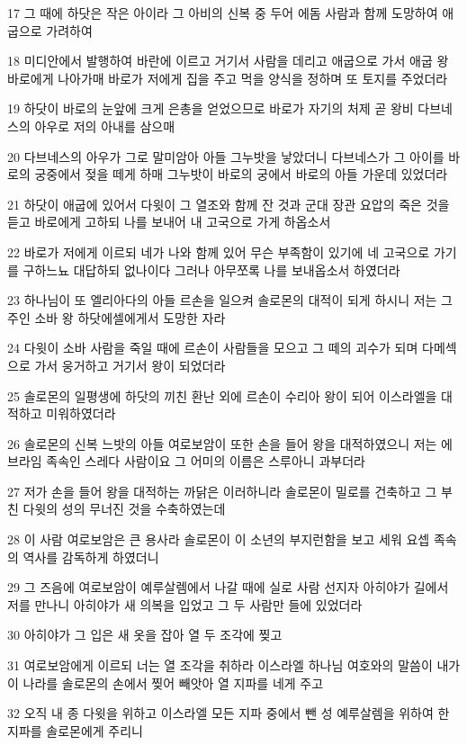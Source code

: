 \par 17 그 때에 하닷은 작은 아이라 그 아비의 신복 중 두어 에돔 사람과 함께 도망하여 애굽으로 가려하여
\par 18 미디안에서 발행하여 바란에 이르고 거기서 사람을 데리고 애굽으로 가서 애굽 왕 바로에게 나아가매 바로가 저에게 집을 주고 먹을 양식을 정하며 또 토지를 주었더라
\par 19 하닷이 바로의 눈앞에 크게 은총을 얻었으므로 바로가 자기의 처제 곧 왕비 다브네스의 아우로 저의 아내를 삼으매
\par 20 다브네스의 아우가 그로 말미암아 아들 그누밧을 낳았더니 다브네스가 그 아이를 바로의 궁중에서 젖을 떼게 하매 그누밧이 바로의 궁에서 바로의 아들 가운데 있었더라
\par 21 하닷이 애굽에 있어서 다윗이 그 열조와 함께 잔 것과 군대 장관 요압의 죽은 것을 듣고 바로에게 고하되 나를 보내어 내 고국으로 가게 하옵소서
\par 22 바로가 저에게 이르되 네가 나와 함께 있어 무슨 부족함이 있기에 네 고국으로 가기를 구하느뇨 대답하되 없나이다 그러나 아무쪼록 나를 보내옵소서 하였더라
\par 23 하나님이 또 엘리아다의 아들 르손을 일으켜 솔로몬의 대적이 되게 하시니 저는 그 주인 소바 왕 하닷에셀에게서 도망한 자라
\par 24 다윗이 소바 사람을 죽일 때에 르손이 사람들을 모으고 그 떼의 괴수가 되며 다메섹으로 가서 웅거하고 거기서 왕이 되었더라
\par 25 솔로몬의 일평생에 하닷의 끼친 환난 외에 르손이 수리아 왕이 되어 이스라엘을 대적하고 미워하였더라
\par 26 솔로몬의 신복 느밧의 아들 여로보암이 또한 손을 들어 왕을 대적하였으니 저는 에브라임 족속인 스레다 사람이요 그 어미의 이름은 스루아니 과부더라
\par 27 저가 손을 들어 왕을 대적하는 까닭은 이러하니라 솔로몬이 밀로를 건축하고 그 부친 다윗의 성의 무너진 것을 수축하였는데
\par 28 이 사람 여로보암은 큰 용사라 솔로몬이 이 소년의 부지런함을 보고 세워 요셉 족속의 역사를 감독하게 하였더니
\par 29 그 즈음에 여로보암이 예루살렘에서 나갈 때에 실로 사람 선지자 아히야가 길에서 저를 만나니 아히야가 새 의복을 입었고 그 두 사람만 들에 있었더라
\par 30 아히야가 그 입은 새 옷을 잡아 열 두 조각에 찢고
\par 31 여로보암에게 이르되 너는 열 조각을 취하라 이스라엘 하나님 여호와의 말씀이 내가 이 나라를 솔로몬의 손에서 찢어 빼앗아 열 지파를 네게 주고
\par 32 오직 내 종 다윗을 위하고 이스라엘 모든 지파 중에서 뺀 성 예루살렘을 위하여 한 지파를 솔로몬에게 주리니
